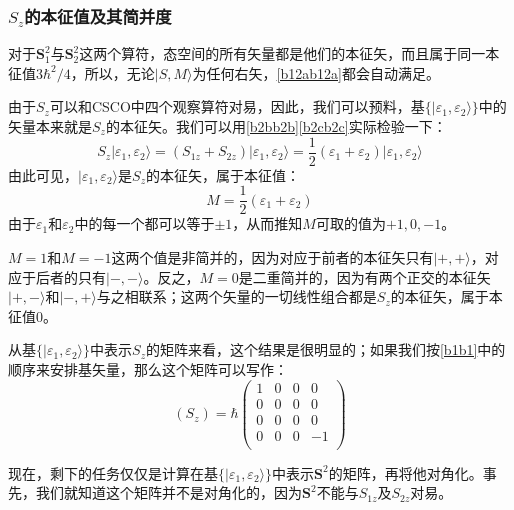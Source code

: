 \documentclass[]{article}
\begin{document}
\subsubsection{$S_z$的本征值及其简并度}
对于$\boldsymbol{S}^2_1$与$\boldsymbol{S}^2_2$这两个算符，态空间的所有矢量都是他们的本征矢，而且属于同一本征值$3\hbar^2/4$，所以，无论$|S,M\rangle$为任何右矢，\eqref{b12ab12a}都会自动满足。\par 
由于$S_z$可以和CSCO中四个观察算符对易，因此，我们可以预料，基$\{|\varepsilon_1,\varepsilon_2\rangle\}$中的矢量本来就是$S_z$的本征矢。我们可以用\eqref{b2bb2b}\eqref{b2cb2c}实际检验一下：
\begin{equation}
	S_z|\varepsilon_1,\varepsilon_2\rangle=(S_{1z}+S_{2z})|\varepsilon_1,\varepsilon_2\rangle=\dfrac{1}{2}(\varepsilon_1+\varepsilon_2)|\varepsilon_1,\varepsilon_2\rangle
\end{equation}
由此可见，$|\varepsilon_1,\varepsilon_2\rangle$是$S_z$的本征矢，属于本征值：
\begin{equation}
	M=\dfrac{1}{2}(\varepsilon_1+\varepsilon_2)
\end{equation}
由于$\varepsilon_1$和$\varepsilon_2$中的每一个都可以等于$\pm1$，从而推知$M$可取的值为$+1,0,-1$。\par 
$M=1$和$M=-1$这两个值是非简并的，因为对应于前者的本征矢只有$|+,+\rangle$，对应于后者的只有$|-,-\rangle$。反之，$M=0$是二重简并的，因为有两个正交的本征矢$|+,-\rangle$和$|-,+\rangle$与之相联系；这两个矢量的一切线性组合都是$S_z$的本征矢，属于本征值$0$。\par 
从基$\{|\varepsilon_1,\varepsilon_2\rangle\}$中表示$S_z$的矩阵来看，这个结果是很明显的；如果我们按\eqref{b1b1}中的顺序来安排基矢量，那么这个矩阵可以写作：
\begin{equation}
	(S_z)=\hbar\begin{pmatrix}
		1&0&0&0\\
		0&0&0&0\\
		0&0&0&0\\
		0&0&0&-1\\
	\end{pmatrix}
\end{equation}

现在，剩下的任务仅仅是计算在基$\{|\varepsilon_1,\varepsilon_2\rangle\}$中表示$\boldsymbol{S}^2$的矩阵，再将他对角化。事先，我们就知道这个矩阵并不是对角化的，因为$\boldsymbol{S}^2$不能与$S_{1z}$及$S_{2z}$对易。
\end{document}
